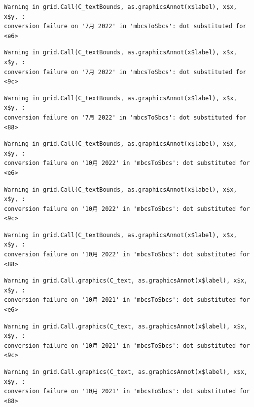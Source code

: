 \documentclass[
  letterpaper,
  DIV=11,
  numbers=noendperiod]{scrartcl}
\begin{document}
\begin{verbatim}
Warning in grid.Call(C_textBounds, as.graphicsAnnot(x$label), x$x, x$y, :
conversion failure on '7月 2022' in 'mbcsToSbcs': dot substituted for <e6>
\end{verbatim}

\begin{verbatim}
Warning in grid.Call(C_textBounds, as.graphicsAnnot(x$label), x$x, x$y, :
conversion failure on '7月 2022' in 'mbcsToSbcs': dot substituted for <9c>
\end{verbatim}

\begin{verbatim}
Warning in grid.Call(C_textBounds, as.graphicsAnnot(x$label), x$x, x$y, :
conversion failure on '7月 2022' in 'mbcsToSbcs': dot substituted for <88>
\end{verbatim}

\begin{verbatim}
Warning in grid.Call(C_textBounds, as.graphicsAnnot(x$label), x$x, x$y, :
conversion failure on '10月 2022' in 'mbcsToSbcs': dot substituted for <e6>
\end{verbatim}

\begin{verbatim}
Warning in grid.Call(C_textBounds, as.graphicsAnnot(x$label), x$x, x$y, :
conversion failure on '10月 2022' in 'mbcsToSbcs': dot substituted for <9c>
\end{verbatim}

\begin{verbatim}
Warning in grid.Call(C_textBounds, as.graphicsAnnot(x$label), x$x, x$y, :
conversion failure on '10月 2022' in 'mbcsToSbcs': dot substituted for <88>
\end{verbatim}

\begin{verbatim}
Warning in grid.Call.graphics(C_text, as.graphicsAnnot(x$label), x$x, x$y, :
conversion failure on '10月 2021' in 'mbcsToSbcs': dot substituted for <e6>
\end{verbatim}

\begin{verbatim}
Warning in grid.Call.graphics(C_text, as.graphicsAnnot(x$label), x$x, x$y, :
conversion failure on '10月 2021' in 'mbcsToSbcs': dot substituted for <9c>
\end{verbatim}

\begin{verbatim}
Warning in grid.Call.graphics(C_text, as.graphicsAnnot(x$label), x$x, x$y, :
conversion failure on '10月 2021' in 'mbcsToSbcs': dot substituted for <88>
\end{verbatim}
\end{document}

